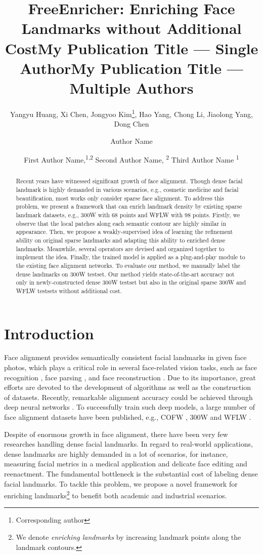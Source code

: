 \documentclass[letterpaper]{article} \usepackage{aaai23}  \usepackage{times}  \usepackage{helvet}  \usepackage{courier}  \usepackage[hyphens]{url}  \usepackage{graphicx} \urlstyle{rm} \def\UrlFont{\rm}  \usepackage{natbib}  \usepackage{caption} \frenchspacing  \setlength{\pdfpagewidth}{8.5in}  \setlength{\pdfpageheight}{11in}  \usepackage{algorithm}
\title{FreeEnricher: Enriching Face Landmarks without Additional Cost}
\author{
Yangyu Huang, Xi Chen, Jongyoo Kim\thanks{Corresponding author}, Hao Yang, Chong Li, Jiaolong Yang, Dong Chen\\
}
\title{My Publication Title --- Single Author}
\author {
    Author Name
}
\title{My Publication Title --- Multiple Authors}
\author {
First Author Name,\textsuperscript{\rm 1,\rm 2}
    Second Author Name, \textsuperscript{\rm 2}
    Third Author Name \textsuperscript{\rm 1}
}
\begin{document}
\maketitle

\begin{abstract}
Recent years have witnessed significant growth of face alignment.
Though dense facial landmark is highly demanded in various scenarios, e.g., cosmetic medicine and facial beautification, most works only consider sparse face alignment.
To address this problem, we present a framework that can enrich landmark density by existing sparse landmark datasets, e.g., 300W with 68 points and WFLW with 98 points.
Firstly, we observe that the local patches along each semantic contour are highly similar in appearance.
Then, we propose a weakly-supervised idea of learning the refinement ability on original sparse landmarks and adapting this ability to enriched dense landmarks.
Meanwhile, several operators are devised and organized together to implement the idea.
Finally, the trained model is applied as a plug-and-play module to the existing face alignment networks.
To evaluate our method, we manually label the dense landmarks on 300W testset.
Our method yields state-of-the-art accuracy not only in newly-constructed dense 300W testset but also in the original sparse 300W and WFLW testsets without additional cost.
\end{abstract}

\section{Introduction}
Face alignment provides semantically consistent facial landmarks in given face photos, which plays a critical role in several face-related vision tasks, such as face recognition \cite{masi2018deep}, face parsing \cite{luo2012hierarchical}, and face reconstruction \cite{jiang2005efficient}.
Due to its importance, great efforts are devoted to the development of algorithms as well as the construction of datasets.
Recently, remarkable alignment accuracy could be achieved through deep neural networks \cite{wu2018look,wang2019adaptive,kumar2020luvli}. 
To successfully train such deep models, a large number of face alignment datasets have been published, e.g., COFW \cite{burgos2013robust}, 300W \cite{sagonas2013300} and WFLW \cite{wu2018look}. 

Despite of enormous growth in face alignment, there have been very few researches handling dense facial landmarks.
In regard to real-world applications, dense landmarks are highly demanded in a lot of scenarios, for instance, measuring facial metrics in a medical application and delicate face editing and reenactment.
The fundamental bottleneck is the substantial cost of labeling dense facial landmarks.
To tackle this problem, we propose a novel framework for enriching landmarks\footnote{We denote \emph{enriching landmarks} by increasing landmark points along the landmark contours.} to benefit both academic and industrial scenarios.
\end{document}
